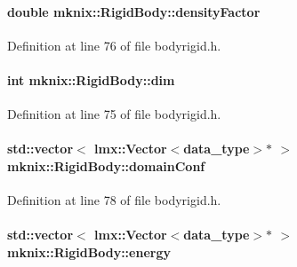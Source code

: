 \paragraph[{density\+Factor}]{\setlength{\rightskip}{0pt plus 5cm}double mknix\+::\+Rigid\+Body\+::density\+Factor\hspace{0.3cm}{\ttfamily [protected]}}\label{classmknix_1_1_rigid_body_ab863575aa5443846e4e07ff2ce058703}


Definition at line 76 of file bodyrigid.\+h.

\hypertarget{classmknix_1_1_rigid_body_abdb2cd12b0d4c08b6ba7a7c3fd84b2e2}{}
\paragraph[{dim}]{\setlength{\rightskip}{0pt plus 5cm}int mknix\+::\+Rigid\+Body\+::dim\hspace{0.3cm}{\ttfamily [protected]}}\label{classmknix_1_1_rigid_body_abdb2cd12b0d4c08b6ba7a7c3fd84b2e2}


Definition at line 75 of file bodyrigid.\+h.

\hypertarget{classmknix_1_1_rigid_body_a723cff9101bc55839f7147af9bb1eca3}{}
\paragraph[{domain\+Conf}]{\setlength{\rightskip}{0pt plus 5cm}std\+::vector$<$ {\bf lmx\+::\+Vector}$<${\bf data\+\_\+type}$>$$\ast$ $>$ mknix\+::\+Rigid\+Body\+::domain\+Conf\hspace{0.3cm}{\ttfamily [protected]}}\label{classmknix_1_1_rigid_body_a723cff9101bc55839f7147af9bb1eca3}


Definition at line 78 of file bodyrigid.\+h.

\hypertarget{classmknix_1_1_rigid_body_a372052707d7e00a97db50ce6d323cdf3}{}
\paragraph[{energy}]{\setlength{\rightskip}{0pt plus 5cm}std\+::vector$<$ {\bf lmx\+::\+Vector}$<${\bf data\+\_\+type}$>$$\ast$ $>$ mknix\+::\+Rigid\+Body\+::energy\hspace{0.3cm}{\ttfamily [protected]}}\label{classmknix_1_1_rigid_body_a372052707d7e00a97db50ce6d323cdf3}


